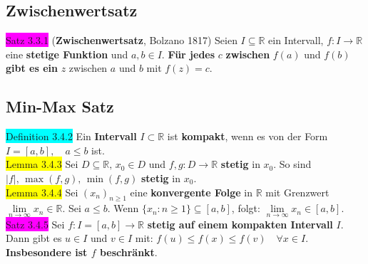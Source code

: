 \documentclass[landscape, 10pt]{article}
\newcommand{\R}{\mathbb{R}}
\begin{document}
\begin{multicols}{3}
       \subsection{Zwischenwertsatz}
              \colorbox{magenta}{Satz 3.3.1} (\textbf{Zwischenwertsatz}, Bolzano 1817) Seien 
                     \textcolor{NavyBlue}{$I\subseteq\R$} ein Intervall, 
                     \textcolor{NavyBlue}{$f:I\longrightarrow\R$} 
                     eine \textbf{stetige Funktion} und 
                     \textcolor{NavyBlue}{$a,b\in I$}. 
                     \textbf{Für jedes} \textcolor{NavyBlue}{$c$} \textbf{zwischen} 
                     \textcolor{NavyBlue}{$f(a)$} und \textcolor{NavyBlue}{$f(b)$} 
                     \textbf{gibt es ein} \textcolor{NavyBlue}{$z$} 
                     zwischen \textcolor{NavyBlue}{$a$} und \textcolor{NavyBlue}{$b$} mit 
                     \textcolor{NavyBlue}{$f(z)=c$}.
       \subsection{Min-Max Satz}
              \colorbox{cyan}{Definition 3.4.2}
                     Ein \textbf{Intervall} $I\subset\R$ ist 
                     \textbf{kompakt}, wenn es 
                     von der Form 
                     \textcolor{NavyBlue}{$I=[a,b],\quad a\leqslant b$} ist.\\
              \colorbox{yellow}{Lemma 3.4.3} 
                     Sei \textcolor{NavyBlue}{$D\subseteq\R,\,x_0\in D$} und 
                     \textcolor{NavyBlue}{$f,g:D\longrightarrow\R$} 
                     \textbf{stetig} in \textcolor{NavyBlue}{$x_0$}. So sind 
                     \textcolor{NavyBlue}{
                     $|f|,\,\max(f,g),\,\min(f,g)$} \textbf{stetig} in 
                     \textcolor{NavyBlue}{$x_0$}.\\
              \colorbox{yellow}{Lemma 3.4.4} 
                     Sei \textcolor{NavyBlue}{$(x_n)_{n\geqslant1}$}
                     eine \textbf{konvergente Folge} in 
                     $\R$ mit Grenzwert 
                     \textcolor{NavyBlue}{$\lim\limits_{n\to\infty}x_n\in\R$}. 
                     Sei \textcolor{NavyBlue}{$a\leqslant b$}. 
                     Wenn \textcolor{NavyBlue}{$\{x_n:n\geqslant1\}\subseteq[a,b]$}, folgt: 
                     \textcolor{NavyBlue}{
                     $\lim\limits_{n\to\infty}x_n\in[a,b]$}. \\
              \colorbox{magenta}{Satz 3.4.5} Sei \textcolor{NavyBlue}{$f:I=[a,b]\longrightarrow\R$}
                     \textbf{stetig auf einem kompakten Intervall} \textcolor{NavyBlue}{$I$}. 
                     Dann gibt es \textcolor{NavyBlue}{$u\in I$} und 
                     \textcolor{NavyBlue}{$v\in I$} mit: 
                     \textcolor{NavyBlue}{
                     $f(u)\leqslant f(x)\leqslant f(v)\quad\forall x\in I$}. 
                     \textbf{Insbesondere ist 
                     \textcolor{NavyBlue}{$f$} beschränkt}.

\end{multicols}
\end{document}
